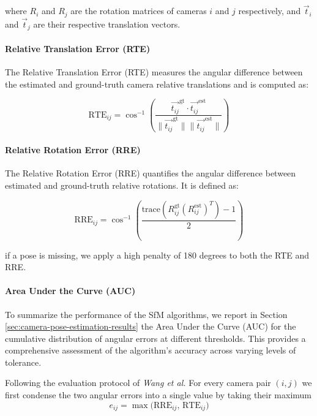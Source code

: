 where \( R_i \) and \( R_j \) are the rotation matrices of cameras \( i \) and \( j \) respectively, and \( \vec{t}_i \) and \( \vec{t}_j \) are their respective translation vectors.

\paragraph{Relative Translation Error (RTE)}
The Relative Translation Error (RTE) measures the angular difference between the estimated and ground-truth camera relative translations and is computed as:

\begin{equation}
    \text{RTE}_{ij} = \cos^{-1}\left(\frac{\vec{t_{ij}}^{\text{gt}} \cdot \vec{t_{ij}}^{\text{est}}}{\lVert \vec{t_{ij}}^{\text{gt}} \rVert \lVert \vec{t_{ij}}^{\text{est}} \rVert}\right)
\end{equation}

\paragraph{Relative Rotation Error (RRE)}
The Relative Rotation Error (RRE) quantifies the angular difference between estimated and ground-truth relative rotations. It is defined as:

\begin{equation}
    \text{RRE}_{ij} = \cos^{-1}\left(\frac{\text{trace}(R_{ij}^{\text{gt}} (R_{ij}^{\text{est}})^T) - 1}{2}\right)
\end{equation}

if a pose is missing, we apply a high penalty of 180 degrees to both the RTE and RRE.

\paragraph{Area Under the Curve (AUC)}
To summarize the performance of the SfM algorithms, we report in Section \ref{sec:camera-pose-estimation-results} the Area Under the Curve (AUC) for the cumulative distribution of angular errors at different thresholds. 
This provides a comprehensive assessment of the algorithm's accuracy across varying levels of tolerance.

Following the evaluation protocol of \emph{Wang et al.} \cite{wang2023vggsfm}
For every camera pair \((i,j)\) we first condense the two angular errors into a single value by taking their maximum
\begin{equation}
    e_{ij} = \max\!\bigl(\text{RRE}_{ij},\,\text{RTE}_{ij}\bigr)
\end{equation}

